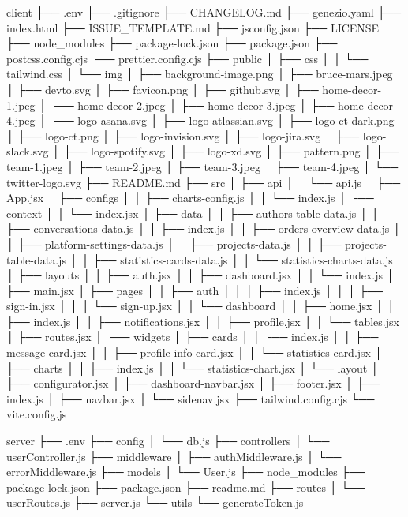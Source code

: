 client
├── .env
├── .gitignore
├── CHANGELOG.md
├── genezio.yaml
├── index.html
├── ISSUE_TEMPLATE.md
├── jsconfig.json
├── LICENSE
├── node_modules
├── package-lock.json
├── package.json
├── postcss.config.cjs
├── prettier.config.cjs
├── public
│   ├── css
│   │   └── tailwind.css
│   └── img
│       ├── background-image.png
│       ├── bruce-mars.jpeg
│       ├── devto.svg
│       ├── favicon.png
│       ├── github.svg
│       ├── home-decor-1.jpeg
│       ├── home-decor-2.jpeg
│       ├── home-decor-3.jpeg
│       ├── home-decor-4.jpeg
│       ├── logo-asana.svg
│       ├── logo-atlassian.svg
│       ├── logo-ct-dark.png
│       ├── logo-ct.png
│       ├── logo-invision.svg
│       ├── logo-jira.svg
│       ├── logo-slack.svg
│       ├── logo-spotify.svg
│       ├── logo-xd.svg
│       ├── pattern.png
│       ├── team-1.jpeg
│       ├── team-2.jpeg
│       ├── team-3.jpeg
│       ├── team-4.jpeg
│       └── twitter-logo.svg
├── README.md
├── src
│   ├── api
│   │   └── api.js
│   ├── App.jsx
│   ├── configs
│   │   ├── charts-config.js
│   │   └── index.js
│   ├── context
│   │   └── index.jsx
│   ├── data
│   │   ├── authors-table-data.js
│   │   ├── conversations-data.js
│   │   ├── index.js
│   │   ├── orders-overview-data.js
│   │   ├── platform-settings-data.js
│   │   ├── projects-data.js
│   │   ├── projects-table-data.js
│   │   ├── statistics-cards-data.js
│   │   └── statistics-charts-data.js
│   ├── layouts
│   │   ├── auth.jsx
│   │   ├── dashboard.jsx
│   │   └── index.js
│   ├── main.jsx
│   ├── pages
│   │   ├── auth
│   │   │   ├── index.js
│   │   │   ├── sign-in.jsx
│   │   │   └── sign-up.jsx
│   │   └── dashboard
│   │       ├── home.jsx
│   │       ├── index.js
│   │       ├── notifications.jsx
│   │       ├── profile.jsx
│   │       └── tables.jsx
│   ├── routes.jsx
│   └── widgets
│       ├── cards
│       │   ├── index.js
│       │   ├── message-card.jsx
│       │   ├── profile-info-card.jsx
│       │   └── statistics-card.jsx
│       ├── charts
│       │   ├── index.js
│       │   └── statistics-chart.jsx
│       └── layout
│           ├── configurator.jsx
│           ├── dashboard-navbar.jsx
│           ├── footer.jsx
│           ├── index.js
│           ├── navbar.jsx
│           └── sidenav.jsx
├── tailwind.config.cjs
└── vite.config.js







server
├── .env
├── config
│   └── db.js
├── controllers
│   └── userController.js
├── middleware
│   ├── authMiddleware.js
│   └── errorMiddleware.js
├── models
│   └── User.js
├── node_modules
├── package-lock.json
├── package.json
├── readme.md
├── routes
│   └── userRoutes.js
├── server.js
└── utils
    └── generateToken.js
